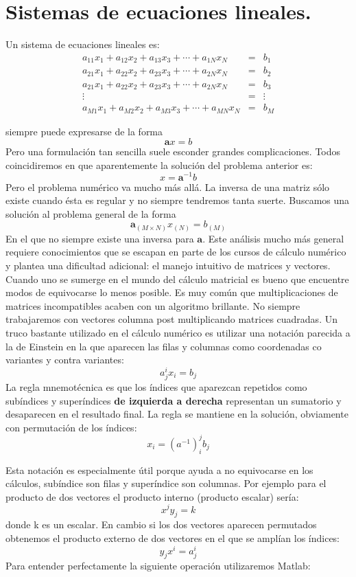 \section{Sistemas de ecuaciones lineales.}

Un sistema de ecuaciones lineales es: 
\begin{eqnarray*}
a_{11}x_{1}+a_{12}x_{2}+a_{13}x_{3}+\cdots+a_{1N}x_{N} & = & b_{1}\\
a_{21}x_{1}+a_{22}x_{2}+a_{23}x_{3}+\cdots+a_{2N}x_{N} & = & b_{2}\\
a_{21}x_{1}+a_{22}x_{2}+a_{23}x_{3}+\cdots+a_{2N}x_{N} & = & b_{3}\\
\vdots & = & \vdots\\
a_{M1}x_{1}+a_{M2}x_{2}+a_{M3}x_{3}+\cdots+a_{MN}x_{N} & = & b_{M}
\end{eqnarray*}

siempre puede expresarse de la forma
$$\mathbf{a}x=b$$
 Pero una formulación tan sencilla suele esconder grandes complicaciones.
Todos coincidiremos en que aparentemente la solución del problema
anterior es:
$$x=\mathbf{a}^{-1}b$$
Pero el problema numérico va mucho más allá. La inversa de una matriz
sólo existe cuando ésta es regular y no siempre tendremos tanta suerte.
Buscamos una solución al problema general de la forma
$$\mathbf{a}_{(M\times N)}x_{(N)}=b_{(M)}$$
En el que no siempre existe una inversa para $\mathbf{a}$. Este análisis
mucho más general requiere conocimientos que se escapan en parte de
los cursos de cálculo numérico y plantea una dificultad adicional:
el manejo intuitivo de matrices y vectores. Cuando uno se sumerge
en el mundo del cálculo matricial es bueno que encuentre modos de
equivocarse lo menos posible. Es muy común que multiplicaciones de
matrices incompatibles acaben con un algoritmo brillante. No siempre
trabajaremos con vectores columna post multiplicando matrices cuadradas.
Un truco bastante utilizado en el cálculo numérico es utilizar una
notación parecida a la de Einstein en la que aparecen las filas y
columnas como coordenadas co variantes y contra variantes:
$$a_{j}^{i}x_{i}=b_{j}$$
La regla mnemotécnica es que los índices que aparezcan repetidos como
subíndices y superíndices \textbf{de izquierda a derecha} representan
un sumatorio y desaparecen en el resultado final. La regla se mantiene
en la solución, obviamente con permutación de los índices:
$$x_{i}=(a^{-1})_{i}^{j}b_{j}$$


Esta notación es especialmente útil porque ayuda a no equivocarse
en los cálculos, subíndice son filas y superíndice son columnas. Por
ejemplo para el producto de dos vectores el producto interno (producto
escalar) sería:
$$x^{j}y_{j}=k$$
donde k es un escalar. En cambio si los dos vectores aparecen permutados
obtenemos el producto externo de dos vectores en el que se amplían
los índices:
$$y_{j}x^{i}=a_{j}^{i}$$
Para entender perfectamente la siguiente operación utilizaremos Matlab:

